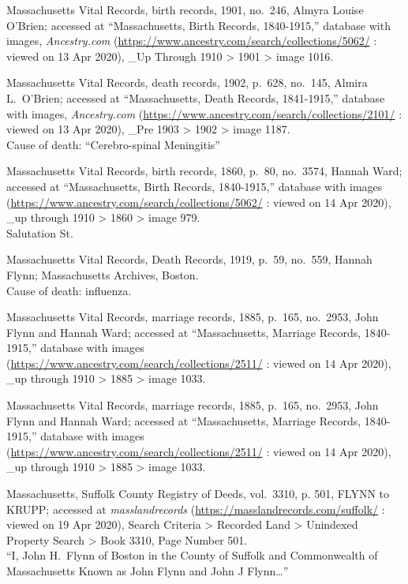 \begin{thebibliography}{999}
Massachusetts Vital Records, birth records, 1901, no.\ 246, Almyra Louise O'Brien; accessed at ``Massachusetts, Birth Records, 1840-1915,'' database with images, \textit{Ancestry.com} (\url{https://www.ancestry.com/search/collections/5062/} : viewed on 13 Apr 2020), \_Up Through 1910 > 1901 > image 1016.

Massachusetts Vital Records, death records, 1902, p.\ 628, no.\ 145, Almira L.\ O'Brien; accessed at ``Massachusetts, Death Records, 1841-1915,'' database with images, \textit{Ancestry.com} (\url{https://www.ancestry.com/search/collections/2101/} : viewed on 13 Apr 2020), \_Pre 1903 > 1902 > image 1187.\\
Cause of death: ``Cerebro-spinal Meningitis''


Massachusetts Vital Records, birth records, 1860, p.\ 80, no.\ 3574, Hannah Ward; accessed at ``Massachusetts, Birth Records, 1840-1915,'' database with images (\url{https://www.ancestry.com/search/collections/5062/} : viewed on 14 Apr 2020), \_up through 1910 > 1860 > image 979.\\
Salutation St.

Massachusetts Vital Records, Death Records, 1919, p.\ 59, no.\ 559, Hannah Flynn; Massachusetts Archives, Boston.\\
Cause of death: influenza.

Massachusetts Vital Records, marriage records, 1885, p.\ 165, no.\ 2953, John Flynn and Hannah Ward; accessed at ``Massachusetts, Marriage Records, 1840-1915,'' database with images (\url{https://www.ancestry.com/search/collections/2511/} : viewed on 14 Apr 2020), \_up through 1910 > 1885 > image 1033.

Massachusetts Vital Records, marriage records, 1885, p.\ 165, no.\ 2953, John Flynn and Hannah Ward; accessed at ``Massachusetts, Marriage Records, 1840-1915,'' database with images (\url{https://www.ancestry.com/search/collections/2511/} : viewed on 14 Apr 2020), \_up through 1910 > 1885 > image 1033.

Massachusetts, Suffolk County Registry of Deeds, vol.\ 3310, p. 501, FLYNN to KRUPP; accessed at \textit{masslandrecords} (\url{https://masslandrecords.com/suffolk/} : viewed on 19 Apr 2020), Search Criteria >  Recorded Land > Unindexed Property Search > Book 3310, Page Number 501.\\
``I, John H.\ Flynn of Boston in the County of Suffolk and Commonwealth of Massachusetts Known as John Flynn and John J Flynn\ldots''


\end{thebibliography}
